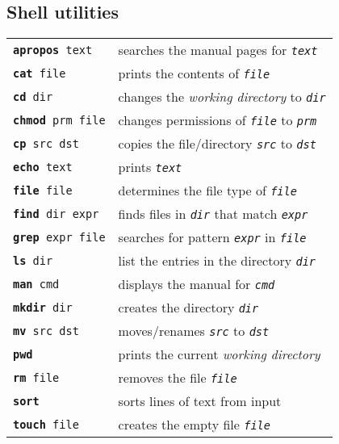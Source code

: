 \documentclass[landscape, a4paper]{article}
\newcommand{\cv}[1]{\textit{\texttt{#1}}}
\newcommand{\shcmd}[2]{\texttt{\textbf{#1} #2}}
\begin{document}
\begin{multicols*}{3}
\subsection*{Shell utilities}
\begin{tabular}{ll}
\shcmd{apropos}{text}       & searches the manual pages for \cv{text}\\
\shcmd{cat}{file}           & prints the contents of \cv{file}\\
\shcmd{cd}{dir}             & changes the \textit{working directory} to \cv{dir}\\
\shcmd{chmod}{prm file}     & changes permissions of \cv{file} to \cv{prm}\\
\shcmd{cp}{src dst}         & copies the file/directory \cv{src} to \cv{dst}\\
\shcmd{echo}{text}          & prints \cv{text}\\
\shcmd{file}{file}          & determines the file type of \cv{file}\\
\shcmd{find}{dir expr}      & finds files in \cv{dir} that match \cv{expr}\\
\shcmd{grep}{expr file}     & searches for pattern \cv{expr} in \cv{file}\\
\shcmd{ls}{dir}             & list the entries in the directory \cv{dir}\\
\shcmd{man}{cmd}            & displays the manual for \cv{cmd}\\
\shcmd{mkdir}{dir}          & creates the directory \cv{dir}\\
\shcmd{mv}{src dst}         & moves/renames \cv{src} to \cv{dst}\\
\shcmd{pwd}{}               & prints the current \textit{working directory}\\
\shcmd{rm}{file}            & removes the file \cv{file}\\
\shcmd{sort}{}              & sorts lines of text from input\\
\shcmd{touch}{file}         & creates the empty file \cv{file}
\end{tabular}

\end{multicols*}
\end{document}

